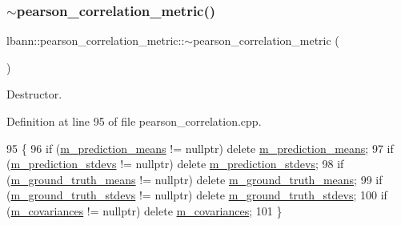 \mbox{\label{classlbann_1_1pearson__correlation__metric_adaa97af452924a44c3894e44e9835923}} 
\subsubsection{\texorpdfstring{$\sim$pearson\+\_\+correlation\+\_\+metric()}{~pearson\_correlation\_metric()}}
{\footnotesize\ttfamily lbann\+::pearson\+\_\+correlation\+\_\+metric\+::$\sim$pearson\+\_\+correlation\+\_\+metric (\begin{DoxyParamCaption}{ }\end{DoxyParamCaption})\hspace{0.3cm}{\ttfamily [virtual]}}

Destructor. 

Definition at line 95 of file pearson\+\_\+correlation.\+cpp.


\begin{DoxyCode}
95                                                         \{
96   \textcolor{keywordflow}{if} (\hyperlink{classlbann_1_1pearson__correlation__metric_ac664eebee2c3d3287848c570400bdddb}{m\_prediction\_means} != \textcolor{keyword}{nullptr})    \textcolor{keyword}{delete} 
      \hyperlink{classlbann_1_1pearson__correlation__metric_ac664eebee2c3d3287848c570400bdddb}{m\_prediction\_means};
97   \textcolor{keywordflow}{if} (\hyperlink{classlbann_1_1pearson__correlation__metric_ad288c4206078866feb39a4f982d8e975}{m\_prediction\_stdevs} != \textcolor{keyword}{nullptr})   \textcolor{keyword}{delete} 
      \hyperlink{classlbann_1_1pearson__correlation__metric_ad288c4206078866feb39a4f982d8e975}{m\_prediction\_stdevs};
98   \textcolor{keywordflow}{if} (\hyperlink{classlbann_1_1pearson__correlation__metric_aa67f395597bf6bbf9bd57645877f26a5}{m\_ground\_truth\_means} != \textcolor{keyword}{nullptr})  \textcolor{keyword}{delete} 
      \hyperlink{classlbann_1_1pearson__correlation__metric_aa67f395597bf6bbf9bd57645877f26a5}{m\_ground\_truth\_means};
99   \textcolor{keywordflow}{if} (\hyperlink{classlbann_1_1pearson__correlation__metric_a7ed5e7a1778d17f852f4277afcaa31ed}{m\_ground\_truth\_stdevs} != \textcolor{keyword}{nullptr}) \textcolor{keyword}{delete} 
      \hyperlink{classlbann_1_1pearson__correlation__metric_a7ed5e7a1778d17f852f4277afcaa31ed}{m\_ground\_truth\_stdevs};
100   \textcolor{keywordflow}{if} (\hyperlink{classlbann_1_1pearson__correlation__metric_aeabb941e22f2718a59103b7ec98a9c1e}{m\_covariances} != \textcolor{keyword}{nullptr})         \textcolor{keyword}{delete} \hyperlink{classlbann_1_1pearson__correlation__metric_aeabb941e22f2718a59103b7ec98a9c1e}{m\_covariances};
101 \}
\end{DoxyCode}


